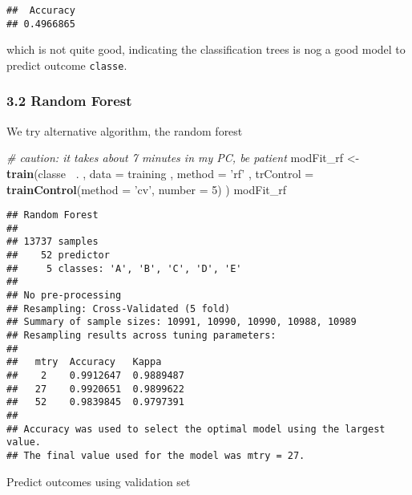 \documentclass[
]{article}
\newenvironment{Shaded}{\begin{snugshade}}{\end{snugshade}}
\newcommand{\CommentTok}[1]{\textcolor[rgb]{0.56,0.35,0.01}{\textit{#1}}}
\newcommand{\DataTypeTok}[1]{\textcolor[rgb]{0.13,0.29,0.53}{#1}}
\newcommand{\DecValTok}[1]{\textcolor[rgb]{0.00,0.00,0.81}{#1}}
\newcommand{\KeywordTok}[1]{\textcolor[rgb]{0.13,0.29,0.53}{\textbf{#1}}}
\newcommand{\NormalTok}[1]{#1}
\newcommand{\OperatorTok}[1]{\textcolor[rgb]{0.81,0.36,0.00}{\textbf{#1}}}
\newcommand{\StringTok}[1]{\textcolor[rgb]{0.31,0.60,0.02}{#1}}
\begin{document}
\begin{verbatim}
##  Accuracy 
## 0.4966865
\end{verbatim}

which is not quite good, indicating the classification trees is nog a
good model to predict outcome \texttt{classe}.

\hypertarget{random-forest}{%
\subsubsection{3.2 Random Forest}\label{random-forest}}

We try alternative algorithm, the random forest

\begin{Shaded}
\begin{Highlighting}[]
\CommentTok{# caution: it takes about 7 minutes in my PC, be patient}
\NormalTok{modFit_rf <-}\StringTok{ }\KeywordTok{train}\NormalTok{(classe }\OperatorTok{~}\NormalTok{.}
\NormalTok{                   , }\DataTypeTok{data =}\NormalTok{ training}
\NormalTok{                   , }\DataTypeTok{method =} \StringTok{'rf'}
\NormalTok{                   , }\DataTypeTok{trControl =} \KeywordTok{trainControl}\NormalTok{(}\DataTypeTok{method =} \StringTok{'cv'}\NormalTok{, }\DataTypeTok{number =} \DecValTok{5}\NormalTok{)    }
\NormalTok{)}
\NormalTok{modFit_rf}
\end{Highlighting}
\end{Shaded}

\begin{verbatim}
## Random Forest 
## 
## 13737 samples
##    52 predictor
##     5 classes: 'A', 'B', 'C', 'D', 'E' 
## 
## No pre-processing
## Resampling: Cross-Validated (5 fold) 
## Summary of sample sizes: 10991, 10990, 10990, 10988, 10989 
## Resampling results across tuning parameters:
## 
##   mtry  Accuracy   Kappa    
##    2    0.9912647  0.9889487
##   27    0.9920651  0.9899622
##   52    0.9839845  0.9797391
## 
## Accuracy was used to select the optimal model using the largest value.
## The final value used for the model was mtry = 27.
\end{verbatim}

Predict outcomes using validation set

\begin{Shaded}
\end{Shaded}
\end{document}
